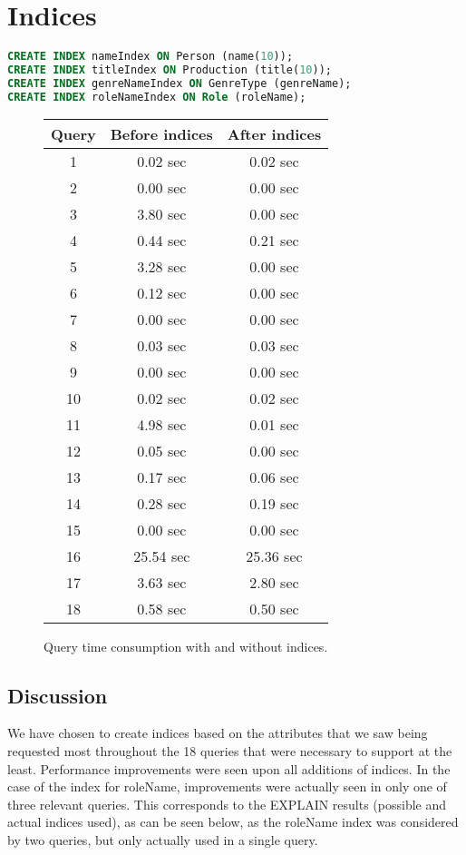 \lstset{
	basicstyle=\normalsize
}

\section{Indices}
\begin{lstlisting}[language=sql]
CREATE INDEX nameIndex ON Person (name(10));
CREATE INDEX titleIndex ON Production (title(10));
CREATE INDEX genreNameIndex ON GenreType (genreName);
CREATE INDEX roleNameIndex ON Role (roleName);
\end{lstlisting}

\begin{figure}[ht]
	\centering
	\begin{tabular}{c|c|c}
		\textbf{Query} & \textbf{Before indices} & \textbf{After indices}\\
		\hline
		1 & 0.02 sec & 0.02 sec\\
		2 & 0.00 sec & 0.00 sec\\
		3 & 3.80 sec & 0.00 sec\\
		4 & 0.44 sec & 0.21 sec\\
		5 & 3.28 sec & 0.00 sec\\
		6 & 0.12 sec & 0.00 sec\\
		7 & 0.00 sec & 0.00 sec\\
		8 & 0.03 sec & 0.03 sec\\
		9 & 0.00 sec & 0.00 sec\\
		10 & 0.02 sec & 0.02 sec\\
		11 & 4.98 sec & 0.01 sec\\
		12 & 0.05 sec & 0.00 sec\\
		13 & 0.17 sec & 0.06 sec\\
		14 & 0.28 sec & 0.19 sec\\
		15 & 0.00 sec & 0.00 sec\\
		16 & 25.54 sec & 25.36 sec\\
		17 & 3.63 sec & 2.80 sec\\
		18 & 0.58 sec & 0.50 sec
	\end{tabular}
	\caption{Query time consumption with and without indices.}
\end{figure}

\subsection{Discussion}
We have chosen to create indices based on the attributes that we saw being requested most throughout the 18 queries that were necessary to support at the least. Performance improvements were seen upon all additions of indices. In the case of the index for roleName, improvements were actually seen in only one of three relevant queries. This corresponds to the EXPLAIN results (possible and actual indices used), as can be seen below, as the roleName index was considered by two queries, but only actually used in a single query.\\

